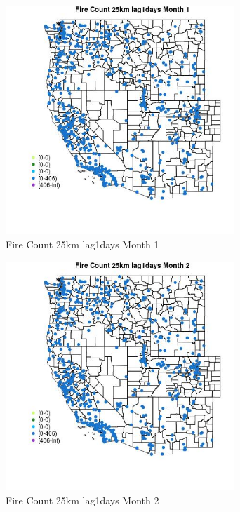 \begin{figure} 
\centering  
\includegraphics[width=0.77\textwidth]{Code_Outputs/Report_ML_input_PM25_Step4_part_f_de_duplicated_aveswNAs_MapObsMo1Fire_Count_25km_lag1days.jpg} 
\caption{\label{fig:Report_ML_input_PM25_Step4_part_f_de_duplicated_aveswNAsMapObsMo1Fire_Count_25km_lag1days}Fire Count 25km lag1days Month 1} 
\end{figure} 
 

\begin{figure} 
\centering  
\includegraphics[width=0.77\textwidth]{Code_Outputs/Report_ML_input_PM25_Step4_part_f_de_duplicated_aveswNAs_MapObsMo2Fire_Count_25km_lag1days.jpg} 
\caption{\label{fig:Report_ML_input_PM25_Step4_part_f_de_duplicated_aveswNAsMapObsMo2Fire_Count_25km_lag1days}Fire Count 25km lag1days Month 2} 
\end{figure} 
 

